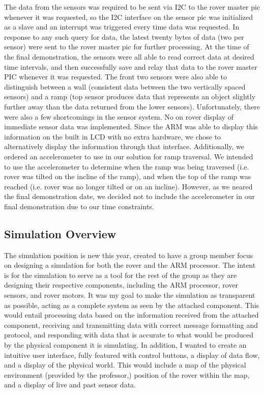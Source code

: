 The data from the sensors was required to be sent via I2C to the rover master pic whenever it was requested, so the I2C interface on the sensor pic was initialized as a slave and an interrupt was triggered every time data was requested. In response to any such query for data, the latest twenty bytes of data (two per sensor) were sent to the rover master pic for further processing. 
At the time of the final demonstration, the sensors were all able to read correct data at desired time intervals, and then successfully save and relay that data to the rover master PIC whenever it was requested. The front two sensors were also able to distinguish between a wall (consistent data between the two vertically spaced sensors) and a ramp (top sensor produces data that represents an object slightly further away than the data returned from the lower sensors).
Unfortunately, there were also a few shortcomings in the sensor system. No on rover display of immediate sensor data was implemented. Since the ARM was able to display this information on the built in LCD with no extra hardware, we chose to alternatively display the information through that interface. Additionally, we ordered an accelerometer to use in our solution for ramp traversal. We intended to use the accelerometer to determine when the ramp was being traversed (i.e. rover was tilted on the incline of the ramp), and when the top of the ramp was reached (i.e. rover was no longer tilted or on an incline). However, as we neared the final demonstration date, we decided not to include the accelerometer in our final demonstration due to our time constraints. 

\subsection{Simulation Overview}
The simulation position is new this year, created to have a group member focus on designing a simulation for both the rover and the ARM processor. The intent is for the simulation to serve as a tool for the rest of the group as they are designing their respective components, including the ARM processor, rover sensors, and rover motors.
It was my goal to make the simulation as transparent as possible, acting as a complete system as seen by the attached component. This would entail processing data based on the information received from the attached component, receiving and transmitting data with correct message formatting and protocol, and responding with data that is accurate to what would be produced by the physical component it is simulating. In addition, I wanted to create an intuitive user interface, fully featured with control buttons, a display of data flow, and a display of the physical world. This would include a map of the physical environment (provided by the professor,) position of the rover within the map, and a display of live and past sensor data.

